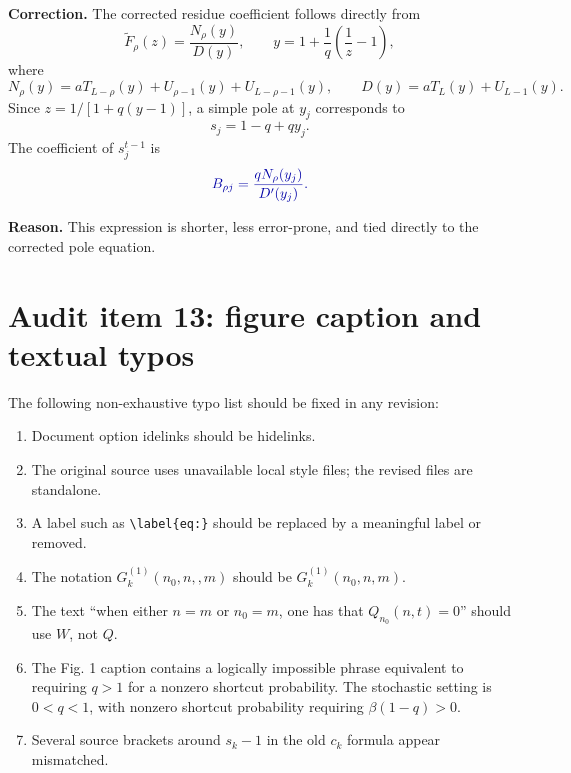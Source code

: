 \documentclass[11pt]{article}
\newcommand{\wt}{\widetilde}
\newcommand{\Original}[1]{\textcolor{red!70!black}{#1}}
\newcommand{\Corrected}[1]{\textcolor{blue!65!black}{#1}}
\newcommand{\Fix}[1]{\par\noindent\textbf{Correction.} #1\par}
\newcommand{\Reason}[1]{\par\noindent\textbf{Reason.} #1\par\medskip}
\begin{document}
\Fix{The corrected residue coefficient follows directly from
\begin{equation}
  \wt F_\rho(z)=\frac{N_\rho(y)}{D(y)},
  \qquad
  y=1+\frac1q\left(\frac1z-1\right),
\end{equation}
where
\begin{equation}
  N_\rho(y)=aT_{L-\rho}(y)+U_{\rho-1}(y)+U_{L-\rho-1}(y),
  \qquad
  D(y)=aT_L(y)+U_{L-1}(y).
\end{equation}
Since $z=1/[1+q(y-1)]$, a simple pole at $y_j$ corresponds to
\begin{equation}
  s_j=1-q+qy_j.
\end{equation}
The coefficient of $s_j^{t-1}$ is
\begin{equation}
  \Corrected{B_{\rho j}=\frac{qN_\rho(y_j)}{D'(y_j)}.}
\end{equation}}

\Reason{This expression is shorter, less error-prone, and tied directly to the corrected pole
equation.}

\section{Audit item 13: figure caption and textual typos}

The following non-exhaustive typo list should be fixed in any revision:
\begin{enumerate}
  \item Document option \Original{idelinks} should be \Corrected{hidelinks}.
  \item The original source uses unavailable local style files; the revised files are standalone.
  \item A label such as \Original{\texttt{\textbackslash label\{eq:\}}} should be replaced by a
  meaningful label or removed.
  \item The notation \Original{$G^{(1)}_k(n_0,n,,m)$} should be
  \Corrected{$G^{(1)}_k(n_0,n,m)$}.
  \item The text ``when either $n=m$ or $n_0=m$, one has that $Q_{n_0}(n,t)=0$'' should use $W$, not
  $Q$.
  \item The Fig. 1 caption contains a logically impossible phrase equivalent to requiring $q>1$ for
  a nonzero shortcut probability.  The stochastic setting is $0<q<1$, with nonzero shortcut
  probability requiring $\beta(1-q)>0$.
  \item Several source brackets around $s_k-1$ in the old $c_k$ formula appear mismatched.
\end{enumerate}
\end{document}
